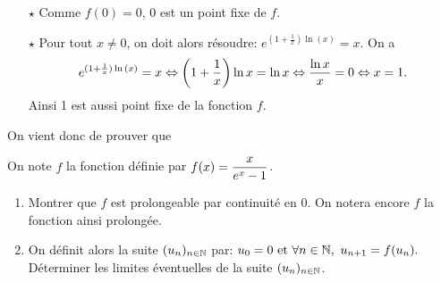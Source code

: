 \documentclass[a4paper, 11pt,reqno]{article}
\begin{document}
\begin{correction}
\begin{enumerate}
\begin{itemize}
			            \begin{itemize}
				            \item[$\star$] Comme $f(0)=0$, 0 est un point fixe de $f$.
				            \item[$\star$] Pour tout $x\not= 0$, on doit alors r\'esoudre: $e^{(1+\frac{1}{x})\ln{(x)}}=x$. On a
				                  $$\displaystyle e^{(1+\frac{1}{x})\ln{(x)}}=x \Leftrightarrow \left( 1+\displaystyle\frac{1}{x}\right)\ln{x}=\ln{x}\Leftrightarrow \displaystyle\frac{\ln{x}}{x}=0\Leftrightarrow x=1.$$
				                  Ainsi 1 est aussi point fixe de la fonction $f$.
			            \end{itemize}
			            On vient donc de prouver que 
		      \end{itemize}
	\end{enumerate}
\end{correction}
\begin{exercice}  \;
	\noindent On note $f$ la fonction d\'efinie par $f(x)=\displaystyle\frac{x}{e^x-1}$.
	\begin{enumerate}
		\item Montrer que $f$ est prolongeable par continuit\'e en 0. On notera encore $f$ la fonction ainsi prolong\'ee.
		\item On d\'efinit alors la suite $(u_n)_{n\in \mathbb{N}}$ par: $u_0=0\ \hbox{et}\ \forall n\in\N,\ u_{n+1}=f(u_n).$
		      D\'eterminer les limites \'eventuelles de la suite $(u_n)_{n\in \mathbb{N}}$.
	\end{enumerate}
\end{exercice}
\end{document}
